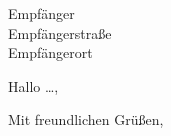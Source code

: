 \documentclass[ngerman]{scrlttr2}
\author{Autorname}
\begin{document}

	\begin{letter}{Empfänger\\Empfängerstraße\\Empfängerort}




		\opening{Hallo \dots,}

			\lipsum

		\closing{Mit freundlichen Grüßen,}


	\end{letter}
\end{document}
